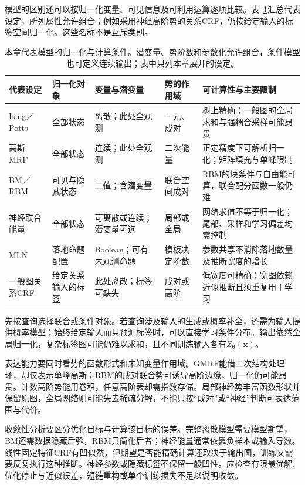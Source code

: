模型的区别还可以按归一化变量、可见信息及可利用运算逐项比较。表~\ref{tab:pgm-energy-models-comparison}汇总代表设定，所列属性允许组合；例如采用神经高阶势的关系CRF，仍按给定输入的标签空间归一化。这些名称不是互斥类别。

\begin{table}[htbp]
  \centering
  \small
  \begin{tabularx}{\linewidth}{p{27mm}p{19mm}p{24mm}p{24mm}X}
    \toprule
    代表设定 & 归一化对象 & 变量与潜变量 & 势的作用域 & 可计算性与主要限制\\
    \midrule
    Ising／Potts & 全部状态 & 离散；此处全观测 & 一元、成对 & 树上精确；一般图的全局求和与强耦合采样可能昂贵\\
    高斯MRF & 全部状态 & 连续；此处全观测 & 二次能量 & 正定精度下可解析归一化；矩阵填充与单峰限制\\
    BM／RBM & 可见与隐藏状态 & 二值；含潜变量 & 联合空间成对 & RBM的块条件与自由能可算，联合配分函数一般仍难\\
    神经联合能量 & 全部状态 & 可离散或连续；潜变量可选 & 局部或全局 & 网络求值不等于归一化；尾部、采样和学习偏差均需控制\\
    MLN & 落地命题配置 & Boolean；可有未观测命题 & 模板决定阶数 & 参数共享不消除落地数量及推断宽度的增长\\
    一般图关系CRF & 给定关系输入的标签 & 此处离散；标签可缺失 & 成对或高阶 & 低宽度可精确；宽图依赖近似推断且须重复用于学习\\
    \bottomrule
  \end{tabularx}
  \caption{本章代表模型的归一化与计算条件。潜变量、势阶数和参数化允许组合，条件模型也可定义连续输出；表中只列本章展开的设定。}
  \label{tab:pgm-energy-models-comparison}
\end{table}

先按查询选择联合或条件对象。若查询涉及输入的生成或概率补全，还需为输入提供概率模型；始终给定输入而只预测标签时，可以直接学习条件分布。输出依然全局归一化，复杂标签图可能仍难以求和，且不同训练输入各有$Z_{\bm{\theta}}(\bm{x})$。

表达能力要同时看势的函数形式和未知变量作用域。GMRF能借二次结构处理环，却仅表示单峰高斯；RBM的成对联合势可诱导高阶边缘，归一化仍可能昂贵。计数高阶势能用卷积，任意高阶表却需指数存储。局部神经势丰富函数形状并保留原图，全局网络则可能失去稀疏分解，不能只按“成对”或“神经”判断可表达范围与代价。

收敛性分析要区分优化目标与计算该目标的误差。完整离散模型需要模型期望，BM还需数据隐藏后验，RBM只简化后者；神经能量通常依靠负样本或输入导数。线性固定特征CRF有凹似然，但期望是否能精确计算还取决于输出图，训练又需要反复执行这种推断。神经参数或隐藏标签不保留一般凹性。应检查有限最优解、优化停止与近似误差，短链重构或单个训练损失不足以说明收敛。

